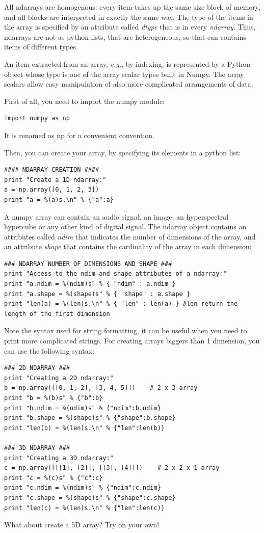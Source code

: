 \documentclass[aps,letterpaper,10pt]{revtex4}
\begin{document}
All ndarrays are homogenous: every item takes up the same size block of memory, and all blocks are interpreted in exactly the same way. The type of the items in the array is specified by an attribute called \textit{dtype} that is in every \textit{ndarray}. Thus, ndarrays are not as python lists, that are heterogeneous, so that can contains items of different types.

An item extracted from an array, \textit{e.g.}, by indexing, is represented by a Python object whose type is one of the array scalar types built in Numpy. The array scalars allow easy manipulation of also more complicated arrangements of data.

First of all, you need to import the numpy module:
\begin{lstlisting}
import numpy as np
\end{lstlisting}
It is renamed as np for a convenient convention.

Then, you can create your array, by specifying its elements in a python list:
\begin{lstlisting}
#### NDARRAY CREATION ####
print "Create a 1D ndarray:"
a = np.array([0, 1, 2, 3])
print "a = %(a)s.\n" % {"a":a}
\end{lstlisting}
A numpy array can contain an audio signal, an image, an hyperspectral hypercube or any other kind of digital signal.
The ndarray object contains an attributes called \textit{ndim} that indicates the number of dimensions of the array, and an attribute \textit{shape} that contains the cardinality of the array in each dimension:
\begin{lstlisting}
### NDARRAY NUMBER OF DIMENSIONS AND SHAPE ###
print "Access to the ndim and shape attributes of a ndarray:"
print "a.ndim = %(ndim)s" % { "ndim" : a.ndim }
print "a.shape = %(shape)s" % { "shape" : a.shape }
print "len(a) = %(len)s.\n" % { "len" : len(a) } #len return the length of the first dimension
\end{lstlisting}
Note the syntax used for string formatting, it can be useful when you need to print more complicated strings.
For creating arrays biggers than 1 dimension, you can use the following syntax:
\begin{lstlisting}
### 2D NDARRAY ###
print "Creating a 2D ndarray:"
b = np.array([[0, 1, 2], [3, 4, 5]])    # 2 x 3 array
print "b = %(b)s" % {"b":b}
print "b.ndim = %(ndim)s" % {"ndim":b.ndim}
print "b.shape = %(shape)s" % {"shape":b.shape}
print "len(b) = %(len)s.\n" % {"len":len(b)}

### 3D NDARRAY ###
print "Creating a 3D ndarray:"
c = np.array([[[1], [2]], [[3], [4]]])    # 2 x 2 x 1 array
print "c = %(c)s" % {"c":c}
print "c.ndim = %(ndim)s" % {"ndim":c.ndim}
print "c.shape = %(shape)s" % {"shape":c.shape}
print "len(c) = %(len)s.\n" % {"len":len(c)}
\end{lstlisting}
What about create a 5D array? Try on your own!
\end{document}
